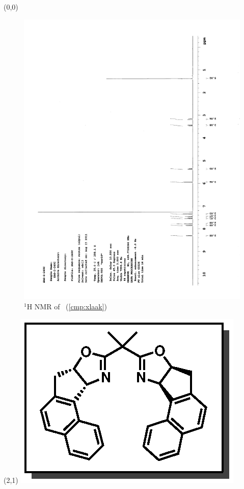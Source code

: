 \begin{textblock}{20}(0,0)
\begin{figure}[htb]
\caption{$^1$H NMR of \CMPxlaak\ (\ref{cmp:xlaak})}
\includegraphics[scale=0.75, trim = 0mm 0mm 0mm 5mm,
clip]{chp_asymmetric/images/nmr/xlaakH}
\vspace{-100pt}
\end{figure}
\end{textblock}
\begin{textblock}{1}(2,1)
\includegraphics[scale=0.8, angle=90]{chp_asymmetric/images/xlaak}
\end{textblock}
